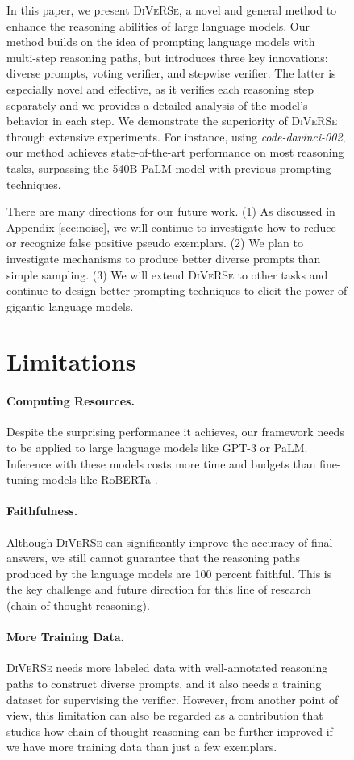 \documentclass[11pt,a4paper]{article}
\begin{document}
\begin{figure}[t]
\begin{tcolorbox}[colback=blue!5!white,colframe=blue!75!black,title=Chain-Of-Thought Reasoning for GSM8K Math Word Problem,fontupper=\footnotesize,fonttitle=\scriptsize]
In this paper, we present \textsc{DiVeRSe}, a novel and general method to enhance the reasoning abilities of large language models. Our method builds on the idea of prompting language models with multi-step reasoning paths, but introduces three key innovations: diverse prompts, voting verifier, and stepwise verifier. The latter is especially novel and effective, as it verifies each reasoning step separately and we provides a detailed analysis of the model's behavior in each step. We demonstrate the superiority of \textsc{DiVeRSe} through extensive experiments. For instance, using \emph{code-davinci-002}, our method achieves state-of-the-art performance on most reasoning tasks, surpassing the 540B PaLM model with previous prompting techniques.

There are many directions for our future work.
(1) As discussed in Appendix \ref{sec:noise}, we will continue to investigate how to reduce or recognize false positive pseudo exemplars.
(2) We plan to investigate mechanisms to produce better diverse prompts than simple sampling.
(3) We will extend \textsc{DiVeRSe} to other tasks and continue to design better prompting techniques to elicit the power of gigantic language models. 

\section{Limitations}

\paragraph{Computing Resources.} Despite the surprising performance it achieves, our framework needs to be applied to large language models like GPT-3 or PaLM. Inference with these models costs more time and budgets than fine-tuning models like RoBERTa \cite{liu2019roberta}.

\paragraph{Faithfulness.} Although \textsc{DiVeRSe} can significantly improve the accuracy of final answers, we still cannot guarantee that the reasoning paths produced by the language models are 100 percent faithful.
This is the key challenge and future direction for this line of research (chain-of-thought reasoning).

\paragraph{More Training Data.} \textsc{DiVeRSe} needs more labeled data with well-annotated reasoning paths to construct diverse prompts, and it also needs a training dataset for supervising the verifier.
However, from another point of view, this limitation can also be regarded as a contribution that studies how chain-of-thought reasoning can be further improved if we have more training data than just a few exemplars.



\end{tcolorbox}
\end{figure}
\end{document}
